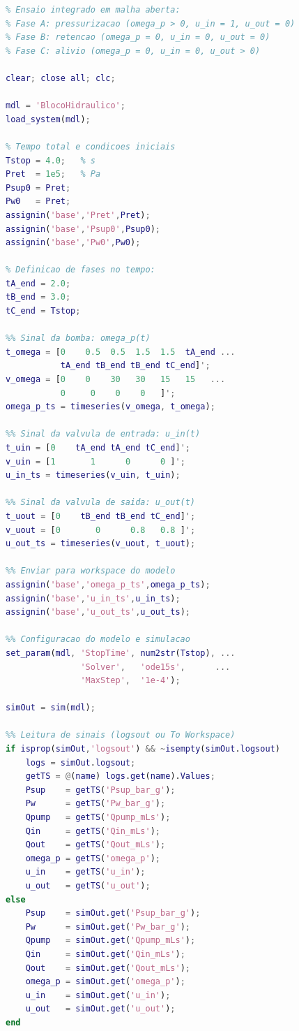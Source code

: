 \begin{lstlisting}[caption={Script MATLAB do ensaio integrado em malha aberta}, label={cod:ensaio_integrado_malha_aberta}, language=Matlab]
%% ensaio_integrado_malha_aberta.m
% Ensaio integrado em malha aberta:
% Fase A: pressurizacao (omega_p > 0, u_in = 1, u_out = 0)
% Fase B: retencao (omega_p = 0, u_in = 0, u_out = 0)
% Fase C: alivio (omega_p = 0, u_in = 0, u_out > 0)

clear; close all; clc;

mdl = 'BlocoHidraulico';
load_system(mdl);

% Tempo total e condicoes iniciais
Tstop = 4.0;   % s
Pret  = 1e5;   % Pa
Psup0 = Pret;
Pw0   = Pret;
assignin('base','Pret',Pret);
assignin('base','Psup0',Psup0);
assignin('base','Pw0',Pw0);

% Definicao de fases no tempo:
tA_end = 2.0;
tB_end = 3.0;
tC_end = Tstop;

%% Sinal da bomba: omega_p(t)
t_omega = [0    0.5  0.5  1.5  1.5  tA_end ...
           tA_end tB_end tB_end tC_end]';
v_omega = [0    0    30   30   15   15   ...
           0     0    0    0   ]';
omega_p_ts = timeseries(v_omega, t_omega);

%% Sinal da valvula de entrada: u_in(t)
t_uin = [0    tA_end tA_end tC_end]';
v_uin = [1       1      0      0 ]';
u_in_ts = timeseries(v_uin, t_uin);

%% Sinal da valvula de saida: u_out(t)
t_uout = [0    tB_end tB_end tC_end]';
v_uout = [0       0      0.8   0.8 ]';
u_out_ts = timeseries(v_uout, t_uout);

%% Enviar para workspace do modelo
assignin('base','omega_p_ts',omega_p_ts);
assignin('base','u_in_ts',u_in_ts);
assignin('base','u_out_ts',u_out_ts);

%% Configuracao do modelo e simulacao
set_param(mdl, 'StopTime', num2str(Tstop), ...
               'Solver',   'ode15s',      ...
               'MaxStep',  '1e-4');

simOut = sim(mdl);

%% Leitura de sinais (logsout ou To Workspace)
if isprop(simOut,'logsout') && ~isempty(simOut.logsout)
    logs = simOut.logsout;
    getTS = @(name) logs.get(name).Values;
    Psup    = getTS('Psup_bar_g');
    Pw      = getTS('Pw_bar_g');
    Qpump   = getTS('Qpump_mLs');
    Qin     = getTS('Qin_mLs');
    Qout    = getTS('Qout_mLs');
    omega_p = getTS('omega_p');
    u_in    = getTS('u_in');
    u_out   = getTS('u_out');
else
    Psup    = simOut.get('Psup_bar_g');
    Pw      = simOut.get('Pw_bar_g');
    Qpump   = simOut.get('Qpump_mLs');
    Qin     = simOut.get('Qin_mLs');
    Qout    = simOut.get('Qout_mLs');
    omega_p = simOut.get('omega_p');
    u_in    = simOut.get('u_in');
    u_out   = simOut.get('u_out');
end


\end{lstlisting}
